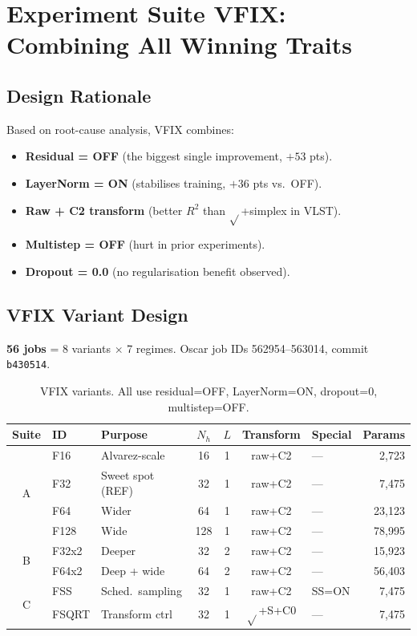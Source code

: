 \documentclass[11pt]{article}
\newcommand{\Rtwo}{R^2}
\begin{document}
\section{Experiment Suite VFIX: Combining All Winning Traits}
\label{sec:vfix}

\subsection{Design Rationale}

Based on root-cause analysis, VFIX combines:
\begin{itemize}[nosep]
  \item \textbf{Residual = OFF} (the biggest single improvement, $+53$ pts).
  \item \textbf{LayerNorm = ON} (stabilises training, $+36$ pts vs.\ OFF).
  \item \textbf{Raw + C2 transform} (better $\Rtwo$ than $\sqrt{}$+simplex in VLST).
  \item \textbf{Multistep = OFF} (hurt in prior experiments).
  \item \textbf{Dropout = 0.0} (no regularisation benefit observed).
\end{itemize}

\subsection{VFIX Variant Design}

\textbf{56 jobs} = 8 variants $\times$ 7 regimes.  Oscar job IDs 562954--563014,
commit \texttt{b430514}.

\begin{table}[H]
\centering
\caption{VFIX variants. All use residual=OFF, LayerNorm=ON, dropout=0, multistep=OFF.}
\label{tab:vfix-design}
\small
\begin{tabular}{@{}cllccclr@{}}
\toprule
Suite & ID & Purpose & $N_h$ & $L$ & Transform & Special & Params \\
\midrule
\multirow{4}{*}{A}
  & F16  & Alvarez-scale    & 16  & 1 & raw+C2 & ---  & 2,723  \\
  & F32  & Sweet spot (REF) & 32  & 1 & raw+C2 & ---  & 7,475  \\
  & F64  & Wider            & 64  & 1 & raw+C2 & ---  & 23,123 \\
  & F128 & Wide             & 128 & 1 & raw+C2 & ---  & 78,995 \\
\midrule
\multirow{2}{*}{B}
  & F32x2 & Deeper          & 32  & 2 & raw+C2 & ---  & 15,923 \\
  & F64x2 & Deep + wide     & 64  & 2 & raw+C2 & ---  & 56,403 \\
\midrule
\multirow{2}{*}{C}
  & FSS   & Sched.\ sampling & 32  & 1 & raw+C2 & SS=ON & 7,475 \\
  & FSQRT & Transform ctrl   & 32  & 1 & $\sqrt{}$+S+C0 & --- & 7,475 \\
\bottomrule
\end{tabular}
\end{table}
\end{document}
